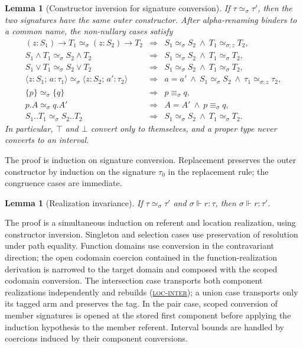 \documentclass[acmsmall,screen,nonacm]{acmart}
\newtheorem{lemma}[theorem]{Lemma}
\newcommand{\ruleref}[1]{%
  \textsc{(\hyperref[rule:#1]{#1})}}
\newcommand{\sing}[1]{\{#1\}}
\newcommand{\pairty}[4]{\langle #1\!:\!#2;\,#3\!:\!#4\rangle}
\newcommand{\interty}[2]{#1\mathbin{\wedge}#2}
\newcommand{\unionty}[2]{#1\mathbin{\vee}#2}
\newcommand{\realizes}{\Vdash}
\begin{document}
\begin{lemma}[Constructor inversion for signature conversion]
\label{lem:conversion-structure}
If \(\tau\simeq_\sigma\tau'\), then the two signatures have the same outer
constructor. After alpha-renaming binders to a common name, the non-nullary
cases satisfy
\[
\begin{array}{rcl}
(z:S_1)\to T_1\simeq_\sigma(z:S_2)\to T_2
&\Longrightarrow&
S_1\simeq_\sigma S_2\ \land\ T_1\simeq_{\sigma;z}T_2,
\\[2pt]
\interty{S_1}{T_1}\simeq_\sigma\interty{S_2}{T_2}
&\Longrightarrow&
S_1\simeq_\sigma S_2\ \land\ T_1\simeq_\sigma T_2,
\\[2pt]
\unionty{S_1}{T_1}\simeq_\sigma\unionty{S_2}{T_2}
&\Longrightarrow&
S_1\simeq_\sigma S_2\ \land\ T_1\simeq_\sigma T_2,
\\[2pt]
\pairty{z}{S_1}{a}{\tau_1}\simeq_\sigma
\pairty{z}{S_2}{a'}{\tau_2}
&\Longrightarrow&
a=a'\ \land\ S_1\simeq_\sigma S_2\ \land\
\tau_1\simeq_{\sigma;z}\tau_2,
\\[2pt]
\sing p\simeq_\sigma\sing q
&\Longrightarrow& p\equiv_\sigma q,
\\[2pt]
p.A\simeq_\sigma q.A'
&\Longrightarrow& A=A'\ \land\ p\equiv_\sigma q,
\\[2pt]
S_1..T_1\simeq_\sigma S_2..T_2
&\Longrightarrow&
S_1\simeq_\sigma S_2\ \land\ T_1\simeq_\sigma T_2.
\end{array}
\]
In particular, \(\top\) and \(\bot\) convert only to themselves, and a
proper type never converts to an interval.
\end{lemma}

The proof is induction on signature conversion. Replacement preserves the
outer constructor by induction on the signature \(\tau_0\) in the replacement
rule; the congruence cases are immediate.

\begin{lemma}[Realization invariance]
\label{lem:conversion-transport}
If \(\tau\simeq_\sigma\tau'\) and
\(\sigma\realizes r:\tau\), then
\(\sigma\realizes r:\tau'\).
\end{lemma}

The proof is a simultaneous induction on referent and location realization,
using constructor inversion. Singleton and selection cases use preservation
of resolution under path equality. Function domains use conversion in the
contravariant direction; the open codomain coercion contained in the
function-realization derivation is narrowed to the target domain and composed
with the scoped codomain conversion. The intersection case transports both
component realizations independently and rebuilds \ruleref{loc-inter}; a
union case transports only its tagged arm and preserves the tag. In the pair
case, scoped conversion of member
signatures is opened at the stored first component before applying the
induction hypothesis to the member referent. Interval bounds are handled by
coercions induced by their component conversions.
\end{document}
